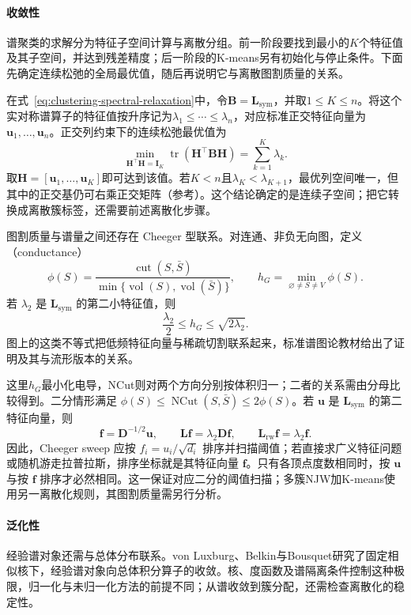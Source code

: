 \paragraph{收敛性}
谱聚类的求解分为特征子空间计算与离散分组。前一阶段要找到最小的$K$个特征值及其子空间，并达到残差精度；后一阶段的K-means另有初始化与停止条件。下面先确定连续松弛的全局最优值，随后再说明它与离散图割质量的关系。

在式~\eqref{eq:clustering-spectral-relaxation}中，令$\bm B=\bm L_{\mathrm{sym}}$，并取$1\leq K\leq n$。将这个实对称谱算子的特征值按升序记为$\lambda_1\leq\cdots\leq\lambda_n$，对应标准正交特征向量为$\bm u_1,\ldots,\bm u_n$。正交列约束下的连续松弛最优值为
\[
 \min_{\bm H^\top\bm H=\bm I_K}
 \operatorname{tr}(\bm H^\top\bm B\bm H)
 =\sum_{k=1}^K\lambda_k.
\]
取$\bm H=[\bm u_1,\ldots,\bm u_K]$即可达到该值。若$K<n$且$\lambda_K<\lambda_{K+1}$，最优列空间唯一，但其中的正交基仍可右乘正交矩阵（参考）。这个结论确定的是连续子空间；把它转换成离散簇标签，还需要前述离散化步骤。

图割质量与谱量之间还存在 Cheeger 型联系。对连通、非负无向图，定义（conductance）
\[
 \phi(S)=
 \frac{\operatorname{cut}(S,\bar S)}
 {\min\{\operatorname{vol}(S),\operatorname{vol}(\bar S)\}},
 \qquad h_G=\min_{\varnothing\ne S\ne V}\phi(S).
\]
若 $\lambda_2$ 是 $\bm{L}_{\mathrm{sym}}$ 的第二小特征值，则
\begin{equation}
 \frac{\lambda_2}{2}\leq h_G\leq\sqrt{2\lambda_2}.
 \label{eq:clustering-cheeger}
\end{equation}
图上的这类不等式把低频特征向量与稀疏切割联系起来，标准谱图论教材给出了证明及其与流形版本的关系。

这里$h_G$最小化电导，NCut则对两个方向分别按体积归一；二者的关系需由分母比较得到。二分情形满足 $\phi(S)\leq\operatorname{NCut}(S,\bar S)\leq2\phi(S)$。若 $\bm{u}$ 是 $\bm{L}_{\mathrm{sym}}$ 的第二特征向量，则
\[
 \bm{f}=\bm{D}^{-1/2}\bm{u},
 \qquad
 \bm{L}\bm{f}=\lambda_2\bm{D}\bm{f},
 \qquad
 \bm{L}_{\mathrm{rw}}\bm{f}=\lambda_2\bm{f}.
\]
因此，Cheeger sweep 应按 $f_i=u_i/\sqrt{d_i}$ 排序并扫描阈值；若直接求广义特征问题或随机游走拉普拉斯，排序坐标就是其特征向量 $\bm{f}$。只有各顶点度数相同时，按 $\bm{u}$ 与按 $\bm{f}$ 排序才必然相同。这一保证对应二分的阈值扫描；多簇NJW加K-means使用另一离散化规则，其图割质量需另行分析。

\paragraph{泛化性}
经验谱对象还需与总体分布联系。von Luxburg、Belkin与Bousquet研究了固定相似核下，经验谱对象向总体积分算子的收敛。核、度函数及谱隔离条件控制这种极限，归一化与未归一化方法的前提不同；从谱收敛到簇分配，还需检查离散化的稳定性。

